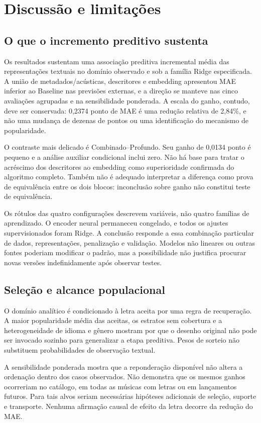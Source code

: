 \chapter{Discussão e limitações}\label{cap:discussao}
\section{O que o incremento preditivo sustenta}
Os resultados sustentam uma associação preditiva incremental média das representações textuais no domínio observado e sob a família Ridge especificada. A união de metadados/acústicas, descritores e embedding apresentou MAE inferior ao Baseline nas previsões externas, e a direção se manteve nas cinco avaliações agrupadas e na sensibilidade ponderada. A escala do ganho, contudo, deve ser conservada: 0,2374 ponto de MAE é uma redução relativa de 2,84\%, e não uma mudança de dezenas de pontos ou uma identificação do mecanismo de popularidade.

O contraste mais delicado é Combinado--Profundo. Seu ganho de 0,0134 ponto é pequeno e a análise auxiliar condicional inclui zero. Não há base para tratar o acréscimo dos descritores ao embedding como superioridade confirmada do algoritmo completo. Também não é adequado interpretar a diferença como prova de equivalência entre os dois blocos: inconclusão sobre ganho não constitui teste de equivalência.

Os rótulos das quatro configurações descrevem variáveis, não quatro famílias de aprendizado. O encoder neural permaneceu congelado, e todos os ajustes supervisionados foram Ridge. A conclusão responde a essa combinação particular de dados, representações, penalização e validação. Modelos não lineares ou outras fontes poderiam modificar o padrão, mas a possibilidade não justifica procurar novas versões indefinidamente após observar testes.

\section{Seleção e alcance populacional}
O domínio analítico é condicionado à letra aceita por uma regra de recuperação. A maior popularidade média das aceitas, os estratos sem cobertura e a heterogeneidade de idioma e gênero mostram por que o desenho original não pode ser invocado sozinho para generalizar a etapa preditiva. Pesos de sorteio não substituem probabilidades de observação textual.

A sensibilidade ponderada mostra que a reponderação disponível não altera a ordenação dentro dos casos observados. Não demonstra que os mesmos ganhos ocorreriam no catálogo, em todas as músicas com letras ou em lançamentos futuros. Para tais alvos seriam necessárias hipóteses adicionais de seleção, suporte e transporte. Nenhuma afirmação causal de efeito da letra decorre da redução do MAE.

